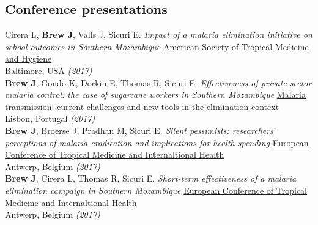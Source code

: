 \documentclass[11pt]{article}
\begin{document}
{{\newpage


% 


\subsection*{Conference presentations}



\noindent Cirera L, \textbf{Brew J}, Valls J, Sicuri E. \emph{Impact of a malaria elimination initiative on school outcomes in Southern Mozambique} \href{http://www.astmh.org/annual-meeting}{American Society of Tropical Medicine and Hygiene} \\
Baltimore, USA \hfill \emph{(2017)}\\

\noindent \textbf{Brew J}, Gondo K, Dorkin E, Thomas R, Sicuri E. \emph{Effectiveness of private sector malaria control: the case of sugarcane workers in Southern Mozambique} \href{http://www.ihmt.unl.pt/en/workshop-malaria-transmission-en/}{Malaria transmission: current challenges and new tools in the elimination context} \\
Lisbon, Portugal \hfill \emph{(2017)}\\

\noindent \textbf{Brew J}, Broerse J, Pradhan M, Sicuri E. \emph{Silent pessimists: researchers' perceptions of malaria eradication and implications for health spending} \href{http://www.ectmih2017.be/}{European Conference of Tropical Medicine and Internaltional Health} \\
Antwerp, Belgium \hfill \emph{(2017)}\\

\noindent \textbf{Brew J}, Cirera L, Thomas R, Sicuri E. \emph{Short-term effectiveness of a malaria elimination campaign in Southern Mozambique} \href{http://www.ectmih2017.be/}{European Conference of Tropical Medicine and Internaltional Health} \\
Antwerp, Belgium \hfill \emph{(2017)}\\

}}
\end{document}
